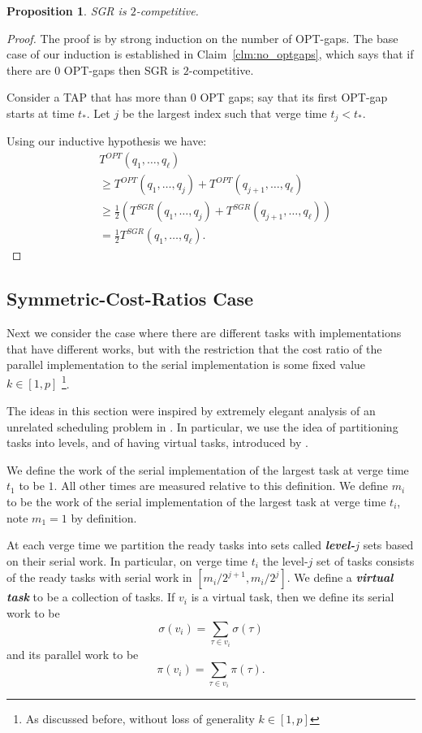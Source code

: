 \documentclass[twocolumn]{article}[10pt]
\newcommand{\defn}[1]{{\textit{\textbf{\boldmath #1}}}\xspace}
\newcommand{\paren}[1]{\left( #1 \right)}
\newtheorem{proposition}{Proposition}
\begin{document}
\begin{proposition}
  \label{prop:2competitive}
  SGR is $2$-competitive.
\end{proposition}
\begin{proof}
  The proof is by strong induction on the number of OPT-gaps. 
  The base case of our induction is established in
  Claim~\ref{clm:no_optgaps}, which says that if there are $0$
  OPT-gaps then SGR is $2$-competitive. 

  Consider a TAP that has more than $0$ OPT gaps;
  say that its first OPT-gap starts at time $t_*$.
  Let $j$ be the largest index such that verge time $t_j <
  t_*$.

  Using our inductive hypothesis we have:
  \begin{align*}
  &T^{OPT}(q_1, \ldots, q_\ell) \\
  &\ge T^{OPT}(q_1, \ldots, q_j) + T^{OPT}(q_{j+1}, \ldots, q_{\ell})\\
  &\ge \frac{1}{2}\paren{T^{SGR}(q_1, \ldots, q_j) + T^{SGR}(q_{j+1}, \ldots, q_{\ell})}\\
  &=\frac{1}{2} T^{SGR}(q_1, \ldots, q_\ell).
  \end{align*}

\end{proof}

\subsection{Symmetric-Cost-Ratios Case}
\label{subsec:symmetriccostratio}
Next we consider the case where there are different tasks with
implementations that have different works, but with the
restriction that the cost ratio of the parallel implementation to
the serial implementation is some fixed value $k \in [1,p]$
\footnote{As discussed before, without loss of generality $k\in
[1,p]$}.

The ideas in this section were inspired by extremely elegant
analysis of an unrelated scheduling problem in \cite{bd20}. In
particular, we use the idea of partitioning tasks into levels,
and of having virtual tasks, introduced by \cite{bd20}.

We define the work of the serial implementation of the largest
task at verge time $t_1$  to be $1$. All other times are measured
relative to this definition. We define $m_i$ to be the work of
the serial implementation of the largest task at verge time
$t_i$, note $m_1 = 1$ by definition. 

At each verge time we partition the ready tasks into
sets called \defn{level-$j$} sets based on their serial work. In
particular, on verge time $t_i$ the level-$j$ set of tasks consists of 
the ready tasks with serial work in $[m_i/2^{j+1}, m_i/2^{j}]$.
We define a \defn{virtual task} to be a collection of tasks.
If $v_i$ is a virtual task, then we define its serial work to be
$$\sigma(v_i) = \sum_{\tau \in v_i} \sigma(\tau)$$ and 
its parallel work to be 
$$\pi(v_i) = \sum_{\tau \in v_i} \pi(\tau).$$
\end{document}
